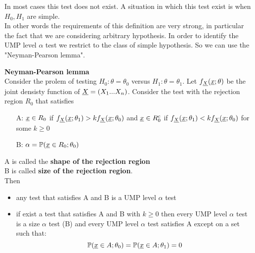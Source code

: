In most cases this test does not exist. A situation in which this test exist is when $H_0, H_1$ are simple.\\
In other words the requirements of this definition are very strong, in particular the fact that we are considering arbitrary hypothesis. In order to identify the UMP level $\alpha$ test we restrict to the class of simple hypothesis. So we can use the "Neyman-Pearson lemma".
\begin{teo}\label{teo:NP} \textbf{Neyman-Pearson lemma}\\
	Consider the prolem of testing $H_0: \theta=\theta_0$ versus $H_1:\theta =\theta_1$. Let $f_{\underline X}(\underline{x};\theta)$ be the joint densisty function of $\underline X=(X_1...X_n)$. Consider the test with the rejection region $R_0$ that satisfies
	\begin{itemize}
		\item[A:]$\underline x \in R_0$ if $f_{\underline X}(\underline x;\theta_1) > k f_{\underline X}(\underline x;\theta_0)$ and $\underline x \in R_0^c$ if $ f_{\underline X}(\underline x;\theta_1)< k f_{\underline X}(\underline x;\theta_0)$ for some $k \geq 0$
		\item[B:]$\alpha=\mathbb{P}(\underline x\in R_0; \theta_0)$
	\end{itemize}
A is called the \textbf{shape of the rejection region}\\
B is called \textbf{size of the rejection region}.\\
Then
\begin{itemize}
	\item any test that satisfies A and B is a UMP level $\alpha$ test
	\item if exist a test that satisfies A and B with $k\geq 0$ then every UMP level $\alpha$ test is a size $\alpha$ test (B) and every UMP level $\alpha$ test satisfies A except on a set such that:
	$$\mathbb{P}(\underline x \in A;\theta_0)=\mathbb{P}(\underline x\in A; \theta_1)=0$$ 
\end{itemize}
\end{teo}  
